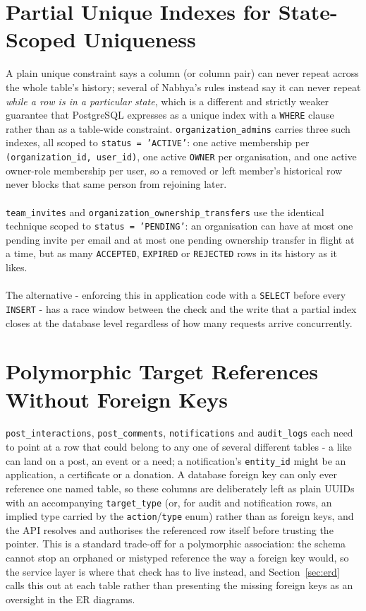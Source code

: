 \section{Partial Unique Indexes for State-Scoped Uniqueness}
\label{sec:deepdive-partial-unique}
A plain unique constraint says a column (or column pair) can never repeat across the whole table's history; several of Nabhya's rules instead say it can never repeat \emph{while a row is in a particular state}, which is a different and strictly weaker guarantee that PostgreSQL expresses as a unique index with a \texttt{WHERE} clause rather than as a table-wide constraint. \texttt{organization\_admins} carries three such indexes, all scoped to \texttt{status = 'ACTIVE'}: one active membership per \texttt{(organization\_id, user\_id)}, one active \texttt{OWNER} per organisation, and one active owner-role membership per user, so a removed or left member's historical row never blocks that same person from rejoining later. \noindent \\ \\ \texttt{team\_invites} and \texttt{organization\_ownership\_transfers} use the identical technique scoped to \texttt{status = 'PENDING'}: an organisation can have at most one pending invite per email and at most one pending ownership transfer in flight at a time, but as many \texttt{ACCEPTED}, \texttt{EXPIRED} or \texttt{REJECTED} rows in its history as it likes.
\noindent \\ \\ The alternative - enforcing this in application code with a \texttt{SELECT} before every \texttt{INSERT} - has a race window between the check and the write that a partial index closes at the database level regardless of how many requests arrive concurrently.

\clearpage

\section{Polymorphic Target References Without Foreign Keys}
\label{sec:deepdive-polymorphic}
\texttt{post\_interactions}, \texttt{post\_comments}, \texttt{notifications} and \texttt{audit\_logs} each need to point at a row that could belong to any one of several different tables - a like can land on a post, an event or a need; a notification's \texttt{entity\_id} might be an application, a certificate or a donation. A database foreign key can only ever reference one named table, so these columns are deliberately left as plain UUIDs with an accompanying \texttt{target\_type} (or, for audit and notification rows, an implied type carried by the \texttt{action}/\texttt{type} enum) rather than as foreign keys, and the API resolves and authorises the referenced row itself before trusting the pointer. This is a standard trade-off for a polymorphic association: the schema cannot stop an orphaned or mistyped reference the way a foreign key would, so the service layer is where that check has to live instead, and Section~\ref{sec:erd} calls this out at each table rather than presenting the missing foreign keys as an oversight in the ER diagrams.

